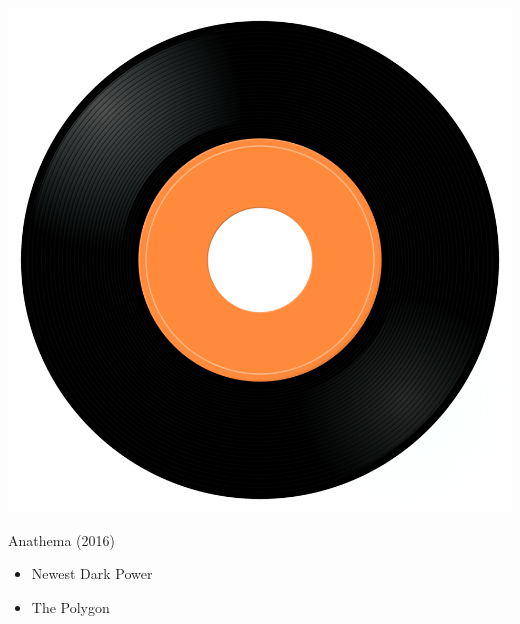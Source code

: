 \begin{minipage}[t]{0.25\textwidth}\vspace{0pt}
\captionsetup{type=figure}
\includegraphics[width=\textwidth]{Images/cover.png}
\caption*{Anathema (2016)}
\end{minipage}
\begin{minipage}[t]{0.25\textwidth}\vspace{0pt}
\begin{itemize}[nosep,leftmargin=1em,labelwidth=*,align=left]
	\setlength{\itemsep}{0pt}
	\item Newest Dark Power
	\item The Polygon
\end{itemize}
\end{minipage}
